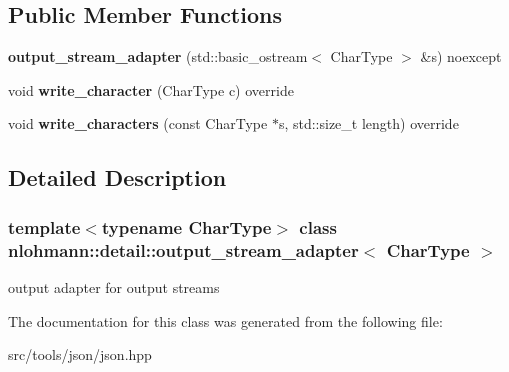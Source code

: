 \subsection*{Public Member Functions}
\begin{DoxyCompactItemize}
\item 
\mbox{\label{classnlohmann_1_1detail_1_1output__stream__adapter_ae44ed343cb1a716248547f48dd045b6a}} 
{\bfseries output\+\_\+stream\+\_\+adapter} (std\+::basic\+\_\+ostream$<$ Char\+Type $>$ \&s) noexcept
\item 
\mbox{\label{classnlohmann_1_1detail_1_1output__stream__adapter_a6e2698c76b200b2d8fac6cebfc43a245}} 
void {\bfseries write\+\_\+character} (Char\+Type c) override
\item 
\mbox{\label{classnlohmann_1_1detail_1_1output__stream__adapter_ad61375497a7d03cb0bdcddfdaad185d0}} 
void {\bfseries write\+\_\+characters} (const Char\+Type $\ast$s, std\+::size\+\_\+t length) override
\end{DoxyCompactItemize}


\subsection{Detailed Description}
\subsubsection*{template$<$typename Char\+Type$>$\newline
class nlohmann\+::detail\+::output\+\_\+stream\+\_\+adapter$<$ Char\+Type $>$}

output adapter for output streams 

The documentation for this class was generated from the following file\+:\begin{DoxyCompactItemize}
\item 
src/tools/json/json.\+hpp\end{DoxyCompactItemize}
